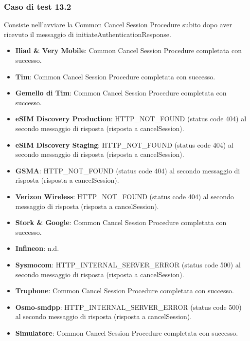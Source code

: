 \documentclass[10pt, oneside]{book}
\begin{document}
\subsubsection{Caso di test 13.2}
Consiste nell'avviare la Common Cancel Session Procedure subito dopo aver ricevuto il messaggio di initiateAuthenticationResponse.
\begin{itemize}
\item \textbf{Iliad \& Very Mobile}: Common Cancel Session Procedure completata con successo.
\item \textbf{Tim}: Common Cancel Session Procedure completata con successo.
\item \textbf{Gemello di Tim}: Common Cancel Session Procedure completata con successo.
\item \textbf{eSIM Discovery Production}: HTTP\_NOT\_FOUND (status code 404) al secondo messaggio di risposta (risposta a cancelSession).
\item \textbf{eSIM Discovery Staging}: HTTP\_NOT\_FOUND (status code 404) al secondo messaggio di risposta (risposta a cancelSession).
\item \textbf{GSMA}: HTTP\_NOT\_FOUND (status code 404) al secondo messaggio di risposta (risposta a cancelSession).
\item \textbf{Verizon Wireless}: HTTP\_NOT\_FOUND (status code 404) al secondo messaggio di risposta (risposta a cancelSession).
\item \textbf{Stork \& Google}: Common Cancel Session Procedure completata con successo.
\item \textbf{Infineon}: n.d.
\item \textbf{Sysmocom}: HTTP\_INTERNAL\_SERVER\_ERROR (status code 500) al secondo messaggio di risposta (risposta a cancelSession).
\item \textbf{Truphone}: Common Cancel Session Procedure completata con successo.
\item \textbf{Osmo-smdpp}: HTTP\_INTERNAL\_SERVER\_ERROR (status code 500) al secondo messaggio di risposta (risposta a cancelSession).
\item \textbf{Simulatore}: Common Cancel Session Procedure completata con successo.
\end{itemize}
\end{document}
